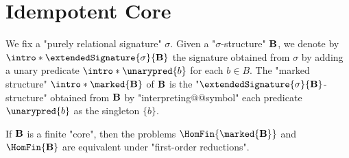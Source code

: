 

\section{Idempotent Core}

We fix a "purely relational signature" $\sigma$.
Given a "$\sigma$-structure" $\mathbf{B}$,
we denote by \AP$\intro*\extendedSignature{\sigma}{\?B}$
the signature obtained from $\sigma$ by adding
a unary predicate \AP$\intro*\unarypred{b}$ for each $b\in B$.
The "marked structure" \AP$\intro*\marked{\?B}$ of $\mathbf{B}$ is the
"$\extendedSignature{\sigma}{\?B}$-structure"
obtained from $\mathbf{B}$ by "interpreting@@symbol" each predicate $\unarypred{b}$ as the
singleton $\{b\}$.

\begin{lemma}
  \AP\label{lemma:marking-preserves-csp-complexity}
  If $\mathbf{B}$ is a finite "core", then the problems $\HomFin{\marked{\?B}}$ and 
  $\HomFin{\?B}$ are equivalent under "first-order reductions".
\end{lemma}

